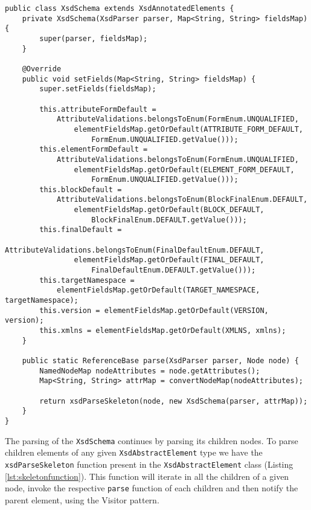 \begin{lstlisting}[caption={XsdSchema Extracting Information from the received Node},captionpos=b,label={lst:xsdschemaparsing}]
public class XsdSchema extends XsdAnnotatedElements {
    private XsdSchema(XsdParser parser, Map<String, String> fieldsMap){
        super(parser, fieldsMap);
    }
    
    @Override
    public void setFields(Map<String, String> fieldsMap) {
        super.setFields(fieldsMap);

        this.attributeFormDefault = 
        	AttributeValidations.belongsToEnum(FormEnum.UNQUALIFIED, 				
        		elementFieldsMap.getOrDefault(ATTRIBUTE_FORM_DEFAULT, 
        			FormEnum.UNQUALIFIED.getValue()));
        this.elementFormDefault = 			 
        	AttributeValidations.belongsToEnum(FormEnum.UNQUALIFIED, 		
        		elementFieldsMap.getOrDefault(ELEMENT_FORM_DEFAULT, 	
        			FormEnum.UNQUALIFIED.getValue()));
        this.blockDefault = 		
            AttributeValidations.belongsToEnum(BlockFinalEnum.DEFAULT, 		
        		elementFieldsMap.getOrDefault(BLOCK_DEFAULT, 	
        			BlockFinalEnum.DEFAULT.getValue()));
        this.finalDefault = 
            AttributeValidations.belongsToEnum(FinalDefaultEnum.DEFAULT, 
        		elementFieldsMap.getOrDefault(FINAL_DEFAULT, 
        			FinalDefaultEnum.DEFAULT.getValue()));
        this.targetNamespace = 
        	elementFieldsMap.getOrDefault(TARGET_NAMESPACE, targetNamespace);
        this.version = elementFieldsMap.getOrDefault(VERSION, version);
        this.xmlns = elementFieldsMap.getOrDefault(XMLNS, xmlns);
    }
    
    public static ReferenceBase parse(XsdParser parser, Node node) {
        NamedNodeMap nodeAttributes = node.getAttributes();
        Map<String, String> attrMap = convertNodeMap(nodeAttributes);        
    
        return xsdParseSkeleton(node, new XsdSchema(parser, attrMap));
    }
}
\end{lstlisting}

\noindent
The parsing of the \texttt{XsdSchema} continues by parsing its children nodes. To parse children elements of any given \texttt{XsdAbstractElement} type we have the \texttt{xsdParseSkeleton} function present in the \texttt{XsdAbstractElement} class (Listing \ref{lst:skeletonfunction}). This function will iterate in all the children of a given node, invoke the respective \texttt{parse} function of each children and then notify the parent element, using the Visitor pattern\cite{gamma1994design}. 

